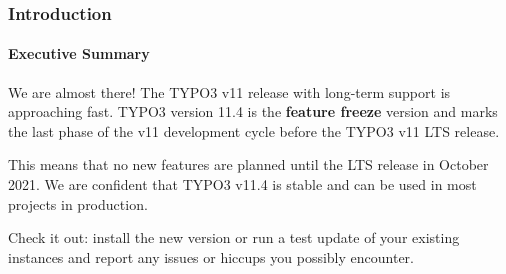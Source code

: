 %

\begin{frame}[fragile]
	\frametitle{Introduction}
	\framesubtitle{Executive Summary}

	\small

		We are almost there! The TYPO3 v11 release with long-term support is
		approaching fast. TYPO3 version 11.4 is the \textbf{feature freeze}
		version and marks the last phase of the v11 development cycle before
		the TYPO3 v11 LTS release.

		\vspace{0.2cm}

		This means that no new features are planned until the LTS release in
		October 2021. We are confident that TYPO3 v11.4 is stable and can be
		used in most projects in production.

		\vspace{0.2cm}

		Check it out: install the new version or run a test update of your
		existing instances and report any issues or hiccups you possibly
		encounter.
	\normalsize

\end{frame}

